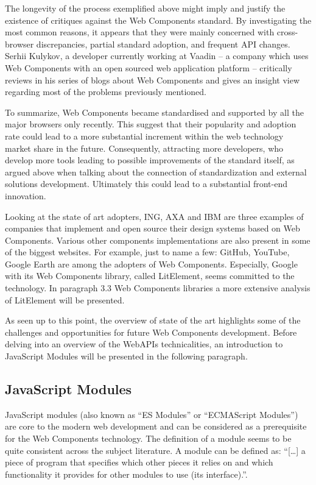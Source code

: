 The longevity of the process exemplified above might imply and justify the existence of critiques against the Web Components standard. By investigating the most common reasons, it appears that they were mainly concerned with cross-browser discrepancies, partial standard adoption, and frequent API changes. Serhii Kulykov, a developer currently working at Vaadin – a company which uses Web Components with an open sourced web application platform – critically reviews in his series of blogs  about Web Components and gives an insight view regarding most of the problems previously mentioned.

To summarize, Web Components became standardised and supported by all the major browsers only recently. This suggest that their popularity and adoption rate could lead to a more substantial increment within the web technology market share in the future. Consequently, attracting more developers, who develop more tools leading to possible improvements of the standard itself, as argued above when talking about the connection of standardization and external solutions development. Ultimately this could lead to a substantial front-end innovation.

Looking at the state of art adopters, ING, AXA and IBM are three examples of companies that implement and open source their design systems based on Web Components. Various other components implementations are also present in some of the biggest websites. For example, just to name a few: GitHub, YouTube, Google Earth are among the adopters of Web Components. Especially, Google with its Web Components library, called LitElement, seems committed to the technology. In paragraph 3.3 Web Components libraries a more extensive analysis of LitElement will be presented.

As seen up to this point, the overview of state of the art highlights some of the challenges and opportunities for future Web Components development. Before delving into an overview of the WebAPIs technicalities, an introduction to JavaScript Modules will be presented in the following paragraph.

\subsection{JavaScript Modules}
\label{subsec:jSModules}

JavaScript modules (also known as “ES Modules” or “ECMAScript Modules”) are core to the modern web development and can be considered as a prerequisite for the Web Components technology. The definition of a module seems to be quite consistent across the subject literature. A module can be defined as: “[…] a piece of program that specifies which other pieces it relies on and which functionality it provides for other modules to use (its interface).”.

